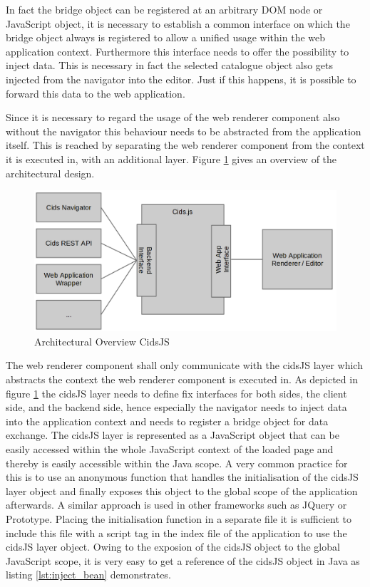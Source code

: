 In fact the bridge object can be registered at an arbitrary DOM node or JavaScript object, it is necessary to establish a common interface on which the bridge object always is registered to allow a unified usage within the web application context.
Furthermore this interface needs to offer the possibility to inject data.
This is necessary in fact the selected catalogue object also gets injected from the navigator into the editor.
Just if this happens, it is possible to forward this data to the web application.

Since it is necessary to regard the usage of the web renderer component also without the navigator this  behaviour needs to be abstracted from the application itself.
This is reached by separating the web renderer component from the context it is executed in, with an additional layer.
Figure \ref{fig:cidsJS} gives an overview of the architectural design.

\begin{figure}
	\centering	\includegraphics[width=1.0\textwidth]{./img/impl/cidsJS.png}
	\caption{Architectural Overview CidsJS}
	\label{fig:cidsJS}
\end{figure}

The web renderer component shall only communicate with the cidsJS layer which abstracts the context the web renderer component is executed in.
As depicted in figure \ref{fig:cidsJS} the cidsJS layer needs to define fix interfaces for both sides, the client side, and the backend side, hence especially the navigator needs to inject data into the application context and needs to register a bridge object for data exchange.
The cidsJS layer is represented as a JavaScript object that can be easily accessed within the whole JavaScript context of the loaded page and thereby is easily accessible within the Java scope.
A very common practice for this is to use an anonymous function that handles the initialisation of the cidsJS layer object and finally exposes this object to the global scope of the application afterwards. 
A similar approach is used in other frameworks such as JQuery or Prototype.
Placing the initialisation function in a separate file it is sufficient to include this file with a script tag in the index file of the application to use the cidsJS layer object.
Owing to the exposion of the cidsJS object to the global JavaScript scope, it is very easy to get a reference of the cidsJS object in Java as listing \ref{lst:inject_bean} demonstrates.
 

